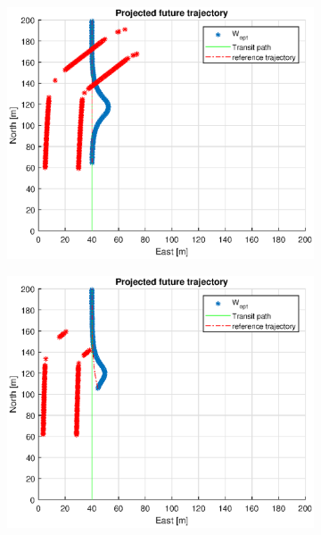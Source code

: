 \begin{figure}
    \hfill
    \\
    \begin{subfigure}[b]{0.49\textwidth}
        \centering
        \includegraphics[width=\textwidth]{Images/Figures/sving_HO/Simple0_f999_Frame3}
    \end{subfigure}
    \hfill
    \begin{subfigure}[b]{0.499\textwidth}
        \centering
        \includegraphics[width=\textwidth]{Images/Figures/sving_HO/Simple0_f999_Frame4}
    \end{subfigure}

\end{figure}
